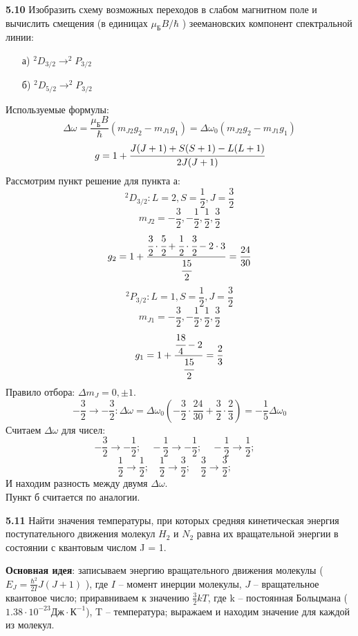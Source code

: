 	\textbf{5.10 }
		Изобразить схему возможных переходов в слабом магнитном поле и
		вычислить смещения (в единицах \( \mu_\text{Б}B/\hbar \) ) 
		зеемановских компонент спектральной линии: 
		\vspace*{-1em}
		\begin{itemize}\itemsep-8pt
			\item[а)] \( ^2D_{3/2} \rightarrow ^2P_{3/2} \)
			\item[б)] \( ^2D_{5/2} \rightarrow ^2P_{3/2} \)
		\end{itemize}
		Используемые формулы: 
		\[ 
			\Delta\omega = \frac{\mu_\text{Б}B}{\hbar}(m_{J2}g_2 - m_{J1}g_1)
			= \Delta\omega_0 (m_{J2}g_2 - m_{J1}g_1)
		\]
		\[ g = 1 + \cfrac{J(J+1)+S(S+1)-L(L+1)}{2J(J+1)} \]
		Рассмотрим пункт решение для пункта а:
		\[ ^2D_{3/2}: L=2, S=\frac{1}{2}, J=\frac{3}{2} \]
		\[ m_{J2} = -\frac{3}{2}, -\frac{1}{2}, \frac{1}{2}, \frac{3}{2} \]
		\[ 
			g_2 = 1 + \frac{\cfrac{3}{2}\cdot\cfrac{5}{2} 
			+ \cfrac{1}{2}\cdot\cfrac{3}{2} - 2\cdot3}{\cfrac{15}{2}} 
			= \frac{24}{30}
		\]
		\[ ^2P_{3/2}: L=1, S=\frac{1}{2}, J=\frac{3}{2} \]
		\[ m_{J1} = -\frac{3}{2}, -\frac{1}{2}, \frac{1}{2}, \frac{3}{2} \]
		\[ g_1 = 1 + \frac{\cfrac{18}{4} - 2}{\cfrac{15}{2}} = \frac{2}{3} \]
		Правило отбора: \( \Delta m_J = 0, \pm1 \).
		\[ -\frac{3}{2} \rightarrow -\frac{3}{2}: 
			\Delta\omega = \Delta\omega_0 (-\frac{3}{2}\cdot\frac{24}{30} 
			+ \frac{3}{2}\cdot\frac{2}{3}) = -\frac{1}{5}\Delta\omega_0 
		\]
		Считаем \( \Delta\omega \) для чисел:
		\[ 
			-\frac{3}{2} \rightarrow -\frac{1}{2};\quad
			-\frac{1}{2} \rightarrow -\frac{1}{2};\quad
			-\frac{1}{2} \rightarrow \frac{1}{2};\quad
		\]
		\[ 
			\frac{1}{2} \rightarrow \frac{1}{2};\quad
			\frac{1}{2} \rightarrow \frac{3}{2};\quad
			\frac{3}{2} \rightarrow \frac{3}{2};\quad
		\]
		И находим разность между двумя \( \Delta\omega \). \\
		Пункт б считается по аналогии.

	\textbf{5.11 }
		Найти значения температуры, при которых средняя кинетическая энергия
		поступательного движения молекул \( H_2 \) и \( N_2 \) равна их 
		вращательной энергии в состоянии с квантовым числом J = 1.
		\par\textbf{Основная идея}: записываем энергию вращательного движения молекулы
		( \( E_J = \frac{\hbar^2}{2I}J(J+1) \) ), где \( I \) -- 
		момент инерции молекулы, \( J \) -- вращательное квантовое число; 
		приравниваем к значению \( \frac{3}{2} kT \), где k -- постоянная Больцмана 
		(\( 1.38\cdot10^{-23} \text{Дж}\cdot\text{К}^{-1} \)), T -- 
		температура; выражаем и находим значение для каждой из молекул.

